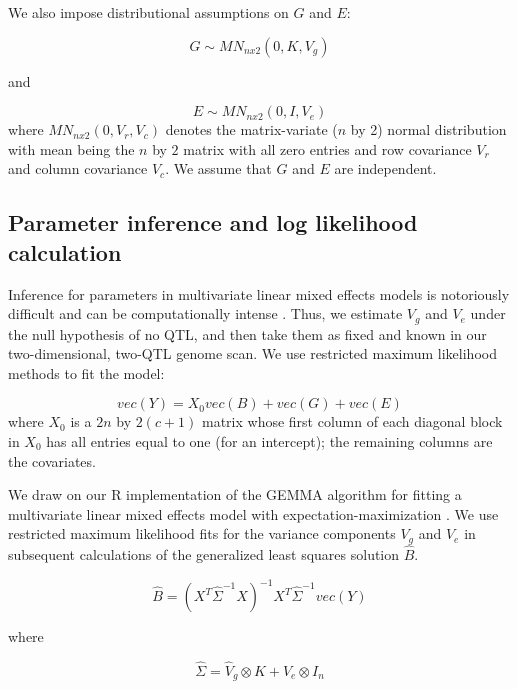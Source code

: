 \documentclass[oneside]{book}\usepackage[]{graphicx}\usepackage[]{color}
\begin{document}
We also impose distributional assumptions on $G$ and $E$:

\begin{equation}
G \sim MN_{n x 2}(0, K, V_g)
\label{eqn:model2}
\end{equation}

and

\begin{equation}
E \sim MN_{nx2}(0, I, V_e)
\label{eqn:model3}
\end{equation}
where $MN_{n x 2}(0, V_r, V_c)$ denotes the matrix-variate ($n$ by 2)
normal distribution with mean being the $n$ by $2$ matrix with all
zero entries and row covariance $V_r$ and column covariance $V_c$. We
assume that $G$ and $E$ are independent.


\subsection{Parameter inference and log likelihood calculation}

Inference for parameters in multivariate linear mixed effects models
is notoriously difficult and can be computationally intense
\citep{meyer1989restricted,meyer1991estimating}. Thus, we estimate
$V_g$ and $V_e$ under the null hypothesis of no QTL, and then take
them as fixed and known in our two-dimensional, two-QTL genome scan.
We use restricted maximum likelihood methods to fit the
model:

\begin{equation}
vec(Y) = X_0vec(B) + vec(G) + vec(E)
\label{model}
\end{equation}
where $X_0$ is a $2n$ by $2(c + 1)$ matrix whose first column of each
diagonal block in $X_0$ has all entries equal to one (for an intercept); the remaining
columns are the covariates.

We draw on our R implementation \citep{gemma2} of the
GEMMA algorithm for fitting a multivariate linear mixed effects model
with expectation-maximization \citep{zhou2014efficient}. We use
restricted maximum likelihood fits for the variance components $V_g$
and $V_e$ in subsequent calculations of the generalized least squares
solution $\hat B$.

\begin{equation}
    \hat B = (X^T\hat\Sigma^{-1}X)^{-1}X^T\hat\Sigma^{-1}vec(Y)
\end{equation}

\noindent where

\begin{equation}
    \hat\Sigma = \hat V_g \otimes K + \hat V_e \otimes I_n
    \label{cov}
\end{equation}
\end{document}
